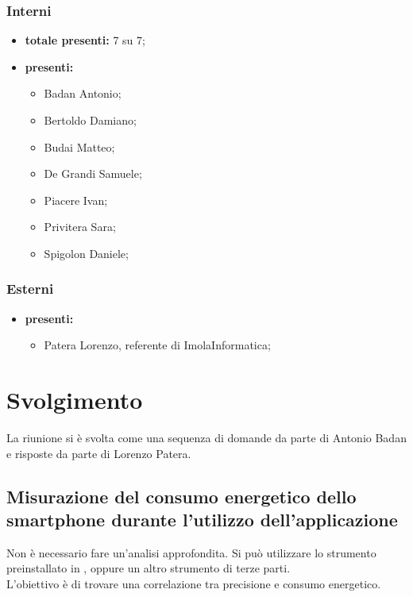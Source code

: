 \subsubsection*{Interni}
\begin{itemize}
	\item \textbf{totale presenti:} 7 su 7;
	\item \textbf{presenti: }
	\begin{itemize}
		\item Badan Antonio;
		\item Bertoldo Damiano;
		\item Budai Matteo;
		\item De Grandi Samuele;
		\item Piacere Ivan;
		\item Privitera Sara;
		\item Spigolon Daniele;
	\end{itemize}
\end{itemize}
\subsubsection*{Esterni}
	\begin{itemize}
		\item \textbf{presenti: }
		\begin{itemize}
			\item Patera Lorenzo, referente di ImolaInformatica;
		\end{itemize}
	\end{itemize}

\newpage
\section*{Svolgimento}
La riunione si è svolta come una sequenza di domande da parte di Antonio Badan e risposte da parte di Lorenzo Patera.

\subsection*{Misurazione del consumo energetico dello smartphone durante l'utilizzo dell'applicazione}
Non è necessario fare un'analisi approfondita. Si può utilizzare lo strumento preinstallato in , oppure un altro strumento di terze parti.\\
L'obiettivo è di trovare una correlazione tra precisione e consumo energetico.

